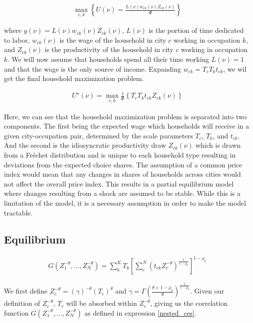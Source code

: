 \documentclass[10pt]{article}
\begin{document}
\begin{align*}
    \max_{c, k} \left\{U(\nu) = \frac{L(\nu) w_{ck}(\nu) Z_{ck}(\nu)}{\Phi} \right\}
\end{align*}

where $y(\nu) = L(\nu) w_{ck}(\nu) Z_{ck}(\nu)$, $L(\nu)$ is the portion of time dedicated to labor, $w_{ck}(\nu)$ is the wage of the household in city $c$ working in occupation $k$, and $Z_{ck}(\nu)$ is the productivity of the household in city $c$ working in occupation $k$. We will now assume that households spend all their time working $L(\nu) = 1$ and that the wage is the only source of income. Expanding $w_{ck} = T_c T_k t_{ck}$, we wil get the final household maximization problem.

\begin{align*}
    U^{\star}(\nu) = \max_{c, k} \frac{1}{\Phi} \left\{T_c T_k t_{ck} Z_{ck}(\nu) \right\}
\end{align*}

Here, we can see that the household maximization problem is separated into two components. The first being the expected wage which households will receive in a given city-occupation pair, determined by the scale parameters $T_c$, $T_k$, and $t_{ck}$. And the second is the idiosyncratic productivity draw $Z_{ck}(\nu)$ which is drawn from a Fr\'{e}chet distribution and is unique to each household type resulting in deviations from the expected choice shares. The assumption of a common price index would mean that any changes in shares of households across cities would not affect the overall price index. This results in a partial equilibrium model where changes resulting from a shock are assumed to be stable. While this is a limitation of the model, it is a necessary assumption in order to make the model tractable.

\subsection{Equilibrium}

\begin{align}
    G(Z_1^{- \theta}, \dots, Z_N^{- \theta}) = \sum_{k}^{K} T_k \left[ \sum_{c}^{N} (t_{ck} Z_c^{- \theta})^{\frac{1}{1 - \rho_k}} \right]^{1 - \rho_k}
    \label{nested_ces}
\end{align}

We first define $Z_c^{- \theta} = (\gamma)^{- \theta} (T_c)^{\theta}$ and $\gamma = \Gamma (\frac{\theta + 1 - \rho_k}{\theta})^{\frac{1}{1 - \rho_k}}$. Given our definition of $Z_c^{- \theta}$, $T_c$ will be absorbed within $Z_c^{- \theta}$, giving us the correlation function $G(Z_1^{- \theta}, \dots, Z_N^{- \theta})$ as defined in expression \ref{nested_ces}.
\end{document}
